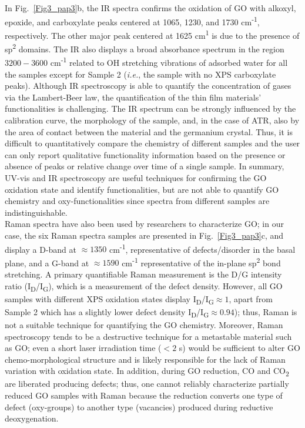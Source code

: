 In Fig.~\ref{Fig3_pap3}b, the IR spectra confirms the oxidation of GO with alkoxyl, epoxide, and carboxylate peaks centered at 1065, 1230, and 1730 cm\textsuperscript{-1}, respectively.\cite{xia2015ultrathin} The other major peak centered at 1625 cm\textsuperscript{1} is due to the presence of sp\textsuperscript{2} domains. The IR also displays a broad absorbance spectrum in the region $3200-3600$ cm\textsuperscript{-1} related to OH stretching vibrations of adsorbed water for all the samples except for Sample 2 (\textit{i.e.}, the sample with no XPS carboxylate peaks). Although IR spectroscopy is able to quantify the concentration of gases via the Lambert-Beer law, the quantification of the thin film materials' functionalities is challenging. The IR spectrum can be strongly influenced by the calibration curve, the morphology of the sample, and, in the case of ATR, also by the area of contact between the material and the germanium crystal. Thus, it is difficult to quantitatively compare the chemistry of different samples and the user can only report qualitative functionality information based on the presence or absence of peaks or relative change over time of a single sample. In summary, UV-vis and IR spectroscopy are useful techniques for confirming the GO oxidation state and identify functionalities, but are not able to quantify GO chemistry and oxy-functionalities since spectra from different samples are indistinguishable.\\
Raman spectra have also been used by researchers to characterize GO;\cite{yang2009chemical} in our case, the six Raman spectra samples are presented in Fig.~\ref{Fig3_pap3}c, and display a D-band at $\approx1350$ cm\textsuperscript{-1}, representative of defects/disorder in the basal plane, and a G-band at $\approx1590$ cm\textsuperscript{-1} representative of the in-plane sp\textsuperscript{2} bond stretching.\cite{amadei2016increase} A primary quantifiable Raman measurement is the D/G intensity ratio (I\textsubscript{D}/I\textsubscript{G}), which is a measurement of the defect density. However, all GO samples with different XPS oxidation states display I\textsubscript{D}/I\textsubscript{G}$\approx1$, apart from Sample 2 which has a slightly lower defect density I\textsubscript{D}/I\textsubscript{G}$\approx0.94$); thus, Raman is not a suitable technique for quantifying the GO chemistry. Moreover, Raman spectroscopy tends to be a destructive technique\cite{rogala2016observer} for a metastable material such as GO; even a short laser irradiation time ($<2$ s) would be sufficient to alter GO chemo-morphological structure and is likely responsible for the lack of Raman variation with oxidation state. In addition, during GO reduction, CO and CO\textsubscript{2} are liberated producing defects; thus, one cannot reliably characterize partially reduced GO samples with Raman because the reduction converts one type of defect (oxy-groups) to another type (vacancies) produced during reductive deoxygenation.\\
